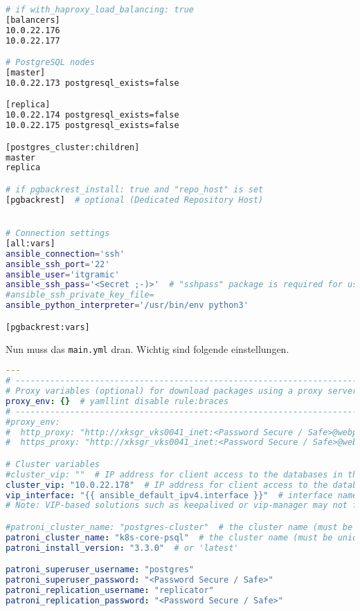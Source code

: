 \begin{flushleft}
\begin{lstlisting}[language=bash, caption=Testsystem - Deployment - inventory,captionpos=b,label={lst:testsystem-deployment-inventory},breaklines=true]
# if with_haproxy_load_balancing: true
[balancers]
10.0.22.176
10.0.22.177

# PostgreSQL nodes
[master]
10.0.22.173 postgresql_exists=false

[replica]
10.0.22.174 postgresql_exists=false
10.0.22.175 postgresql_exists=false

[postgres_cluster:children]
master
replica

# if pgbackrest_install: true and "repo_host" is set
[pgbackrest]  # optional (Dedicated Repository Host)


# Connection settings
[all:vars]
ansible_connection='ssh'
ansible_ssh_port='22'
ansible_user='itgramic'
ansible_ssh_pass='<Secret ;-)>'  # "sshpass" package is required for use "ansible_ssh_pass"
#ansible_ssh_private_key_file=
ansible_python_interpreter='/usr/bin/env python3'

[pgbackrest:vars]

    \end{lstlisting}
    Nun muss das \texttt{main.yml} dran.
    Wichtig sind folgende einstellungen.
    \lstset{style=gra_codestyle}
    \begin{lstlisting}[language=yaml, caption=Testsystem - Deployment - main.yml,captionpos=b,label={lst:testsystem-deployment-main.yml},breaklines=true]
---
# ---------------------------------------------------------------------
# Proxy variables (optional) for download packages using a proxy server
proxy_env: {}  # yamllint disable rule:braces
# ---------------------------------------------------------------------
#proxy_env:
#  http_proxy: "http://xksgr_vks0041_inet:<Password Secure / Safe>@webproxy.sivc.first-it.ch:9090"
#  https_proxy: "http://xksgr_vks0041_inet:<Password Secure / Safe>@webproxy.sivc.first-it.ch:9090"

# Cluster variables
#cluster_vip: ""  # IP address for client access to the databases in the cluster (optional).
cluster_vip: "10.0.22.178"  # IP address for client access to the databases in the cluster (optional).
vip_interface: "{{ ansible_default_ipv4.interface }}"  # interface name (e.g., "ens32").
# Note: VIP-based solutions such as keepalived or vip-manager may not function correctly in cloud environments like AWS.

#patroni_cluster_name: "postgres-cluster"  # the cluster name (must be unique for each cluster)
patroni_cluster_name: "k8s-core-psql"  # the cluster name (must be unique for each cluster)
patroni_install_version: "3.3.0"  # or 'latest'

patroni_superuser_username: "postgres"
patroni_superuser_password: "<Password Secure / Safe>"
patroni_replication_username: "replicator"
patroni_replication_password: "<Password Secure / Safe>"


\end{lstlisting}
\end{flushleft}
